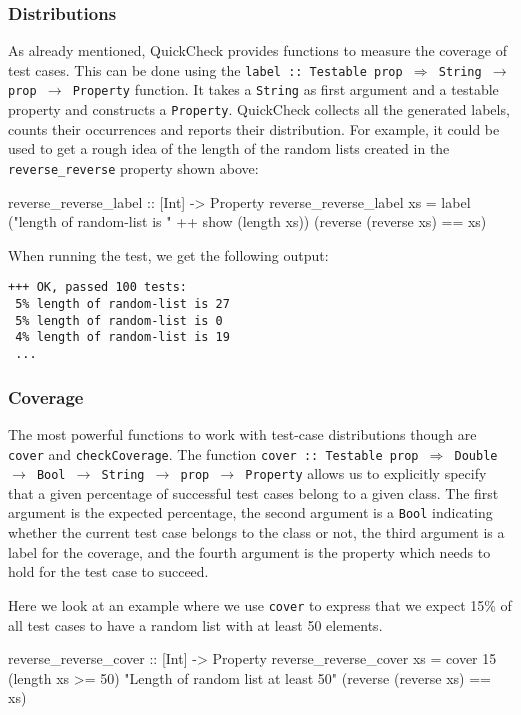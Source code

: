 \subsubsection{Distributions}
As already mentioned, QuickCheck provides functions to measure the coverage of test cases. This can be done using the 
\texttt{label :: Testable prop $\Rightarrow$ String $\rightarrow$ prop $\rightarrow$ Property} function. It takes a \texttt{String} as first argument and a testable property and constructs a \texttt{Property}. QuickCheck collects all the generated labels, counts their occurrences and reports their distribution. For example, it could be used to get a rough idea of the length of the random lists created in the \texttt{reverse\_reverse} property shown above:

\begin{HaskellCode}
reverse_reverse_label :: [Int] -> Property
reverse_reverse_label xs  
  = label ("length of random-list is " ++ show (length xs)) 
          (reverse (reverse xs) == xs)
\end{HaskellCode}
When running the test, we get the following output:

\begin{verbatim}
+++ OK, passed 100 tests:
 5% length of random-list is 27
 5% length of random-list is 0
 4% length of random-list is 19
 ...
\end{verbatim}

\subsubsection{Coverage}
The most powerful functions to work with test-case distributions though are \texttt{cover} and \texttt{checkCoverage}. The function \texttt{cover :: Testable prop $\Rightarrow$ Double $\rightarrow$ Bool $\rightarrow$ String $\rightarrow$ prop $\rightarrow$ Property} allows us to explicitly specify that a given percentage of successful test cases belong to a given class. The first argument is the expected percentage, the second argument is a \texttt{Bool} indicating whether the current test case belongs to the class or not, the third argument is a label for the coverage, and the fourth argument is the property which needs to hold for the test case to succeed. 

Here we look at an example where we use \texttt{cover} to express that we expect 15\% of all test cases to have a random list with at least 50 elements.

\begin{HaskellCode}
reverse_reverse_cover :: [Int] -> Property
reverse_reverse_cover xs  
  = cover 15 (length xs >= 50) "Length of random list at least 50"
             (reverse (reverse xs) == xs)
\end{HaskellCode}

